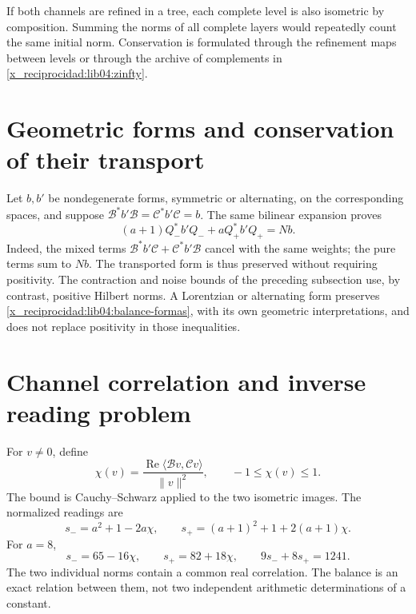 If both channels are refined in a tree, each complete level is also
isometric by composition. Summing the norms of all complete layers
would repeatedly count the same initial norm. Conservation
is formulated through the refinement maps between levels or
through the archive of complements in \eqref{x_reciprocidad:lib04:zinfty}.

\section{Geometric forms and conservation of their transport}
\label{x_reciprocidad:lib04:formas}

Let \(b,b'\) be nondegenerate forms, symmetric or alternating, on
the corresponding spaces, and suppose
\(\mathcal B^*b'\mathcal B=\mathcal C^*b'\mathcal C=b\).
The same bilinear expansion proves
\begin{equation}
 (a+1)Q_-^*b'Q_-+aQ_+^*b'Q_+=Nb.
 \label{x_reciprocidad:lib04:balance-formas}
\end{equation}
Indeed, the mixed terms
\(\mathcal B^*b'\mathcal C+\mathcal C^*b'\mathcal B\) cancel
with the same weights; the pure terms sum to \(Nb\).
The transported form is thus preserved without requiring positivity.
The contraction and noise bounds of the preceding subsection use,
by contrast, positive Hilbert norms. A Lorentzian or
alternating form preserves \eqref{x_reciprocidad:lib04:balance-formas}, with its own
geometric interpretations, and does not replace positivity in those
inequalities.

\section{Channel correlation and inverse reading problem}
\label{x_reciprocidad:lib04:correlacion}

For \(v\neq0\), define
\begin{equation}
 \chi(v)=\frac{\operatorname{Re}\langle\mathcal Bv,\mathcal Cv\rangle}
                      {\|v\|^2},\qquad -1\leq\chi(v)\leq1.
 \label{x_reciprocidad:lib04:chi}
\end{equation}
The bound is Cauchy--Schwarz applied to the two isometric images.
The normalized readings are
\begin{equation}
 s_-=a^2+1-2a\chi,\qquad
 s_+=(a+1)^2+1+2(a+1)\chi.
 \label{x_reciprocidad:lib04:s-pm}
\end{equation}
For \(a=8\),
\begin{equation}
 s_-=65-16\chi,\qquad s_+=82+18\chi,\qquad
 9s_-+8s_+=1241.
 \label{x_reciprocidad:lib04:s-canonico}
\end{equation}
The two individual norms contain a common real correlation. The
balance is an exact relation between them, not two independent arithmetic
determinations of a constant.

